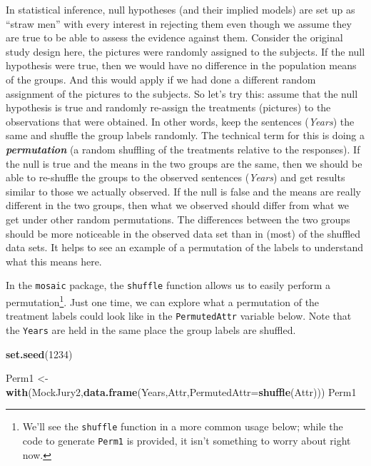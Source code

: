 \documentclass[]{book}
\newenvironment{Shaded}{\begin{snugshade}}{\end{snugshade}}
\newcommand{\KeywordTok}[1]{\textcolor[rgb]{0.13,0.29,0.53}{\textbf{#1}}}
\newcommand{\DataTypeTok}[1]{\textcolor[rgb]{0.13,0.29,0.53}{#1}}
\newcommand{\DecValTok}[1]{\textcolor[rgb]{0.00,0.00,0.81}{#1}}
\newcommand{\StringTok}[1]{\textcolor[rgb]{0.31,0.60,0.02}{#1}}
\newcommand{\NormalTok}[1]{#1}
\let\rmarkdownfootnote\footnote%
\def\footnote{\protect\rmarkdownfootnote}
\begin{document}
In statistical inference, null hypotheses (and their implied models) are
set up as ``straw men'' with every interest in rejecting them even
though we assume they are true to be able to assess the evidence against
them. Consider the original study design here, the pictures were
randomly assigned to the subjects. If the null hypothesis were true,
then we would have no difference in the population means of the groups.
And this would apply if we had done a different random assignment of the
pictures to the subjects. So let's try this: assume that the null
hypothesis is true and randomly re-assign the treatments (pictures) to
the observations that were obtained. In other words, keep the sentences
(\emph{Years}) the same and shuffle the group labels randomly. The
technical term for this is doing a \textbf{\emph{permutation}} (a random
shuffling of the treatments relative to the responses). If the null is
true and the means in the two groups are the same, then we should be
able to re-shuffle the groups to the observed sentences (\emph{Years})
and get results similar to those we actually observed. If the null is
false and the means are really different in the two groups, then what we
observed should differ from what we get under other random permutations.
The differences between the two groups should be more noticeable in the
observed data set than in (most) of the shuffled data sets. It helps to
see an example of a permutation of the labels to understand what this
means here.

In the \texttt{mosaic} package, the \texttt{shuffle} function allows us
to easily perform a permutation\footnote{We'll see the \texttt{shuffle}
  function in a more common usage below; while the code to generate
  \texttt{Perm1} is provided, it isn't something to worry about right
  now.}. Just one time, we can explore what a permutation of the
treatment labels could look like in the \texttt{PermutedAttr} variable
below. Note that the \texttt{Years} are held in the same place the group
labels are shuffled.

\begin{Shaded}
\begin{Highlighting}[]
\KeywordTok{set.seed}\NormalTok{(}\DecValTok{1234}\NormalTok{)}
\end{Highlighting}
\end{Shaded}

\begin{Shaded}
\begin{Highlighting}[]
\NormalTok{Perm1 <-}\StringTok{ }\KeywordTok{with}\NormalTok{(MockJury2,}\KeywordTok{data.frame}\NormalTok{(Years,Attr,}\DataTypeTok{PermutedAttr=}\KeywordTok{shuffle}\NormalTok{(Attr)))}
\NormalTok{Perm1}
\end{Highlighting}
\end{Shaded}
\end{document}

